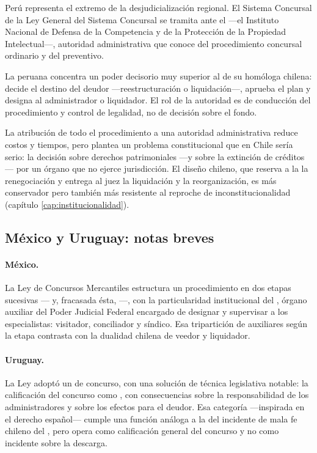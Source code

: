 Perú representa el extremo de la desjudicialización regional. El Sistema Concursal de la Ley
General del Sistema Concursal se tramita ante el  ---el Instituto
Nacional de Defensa de la Competencia y de la Protección de la Propiedad Intelectual---, autoridad
administrativa que conoce del procedimiento concursal ordinario y del preventivo.

La  peruana concentra un poder decisorio muy superior al de su
homóloga chilena: decide el destino del deudor ---reestructuración o liquidación---, aprueba el
plan y designa al administrador o liquidador. El rol de la autoridad es de conducción del
procedimiento y control de legalidad, no de decisión sobre el fondo.

\begin{alerta}
La atribución de todo el procedimiento a una autoridad administrativa reduce costos y tiempos, pero
plantea un problema constitucional que en Chile sería serio: la decisión sobre derechos
patrimoniales ---y sobre la extinción de créditos--- por un órgano que no ejerce jurisdicción. El
diseño chileno, que reserva a la \superir{} la renegociación y entrega al juez la liquidación y la
reorganización, es más conservador pero también más resistente al reproche de inconstitucionalidad
(capítulo \ref{cap:institucionalidad}).
\end{alerta}

\subsection{México y Uruguay: notas breves}

\paragraph{México.} La Ley de Concursos Mercantiles estructura un procedimiento en dos etapas
sucesivas --- y, fracasada ésta, ---, con la
particularidad institucional del , órgano auxiliar del Poder Judicial
Federal encargado de designar y supervisar a los especialistas: visitador, conciliador y síndico.
Esa tripartición de auxiliares según la etapa contrasta con la dualidad chilena de veedor y
liquidador.

\paragraph{Uruguay.} La Ley  adoptó un  de concurso, con
una solución de técnica legislativa notable: la calificación del concurso como
, con consecuencias sobre la responsabilidad de los administradores y
sobre los efectos para el deudor. Esa categoría ---inspirada en el derecho español--- cumple una
función análoga a la del incidente de mala fe chileno del , pero opera como calificación
general del concurso y no como incidente sobre la descarga.

